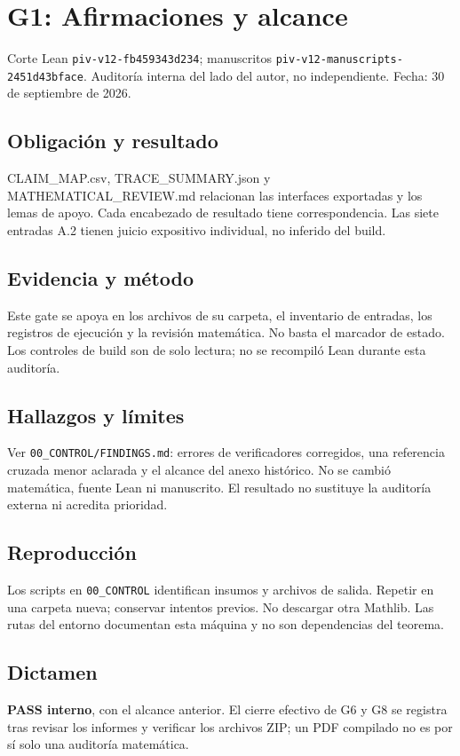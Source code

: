 \documentclass[11pt]{article}
\begin{document}
\section{G1: Afirmaciones y alcance}\label{g1-afirmaciones-y-alcance}

Corte Lean \nolinkurl{piv-v12-fb459343d234}; manuscritos
\nolinkurl{piv-v12-manuscripts-2451d43bface}. Auditoría interna del lado
del autor, no independiente. Fecha: 30 de septiembre de 2026.

\subsection{Obligación y resultado}\label{obligaciuxf3n-y-resultado}

CLAIM\_MAP.csv, TRACE\_SUMMARY.json y MATHEMATICAL\_REVIEW.md relacionan
las interfaces exportadas y los lemas de apoyo. Cada encabezado de
resultado tiene correspondencia. Las siete entradas A.2 tienen juicio
expositivo individual, no inferido del build.

\subsection{Evidencia y método}\label{evidencia-y-muxe9todo}

Este gate se apoya en los archivos de su carpeta, el inventario de
entradas, los registros de ejecución y la revisión matemática. No basta
el marcador de estado. Los controles de build son de solo lectura; no se
recompiló Lean durante esta auditoría.

\subsection{Hallazgos y límites}\label{hallazgos-y-luxedmites}

Ver \nolinkurl{00_CONTROL/FINDINGS.md}: errores de verificadores
corregidos, una referencia cruzada menor aclarada y el alcance del anexo
histórico. No se cambió matemática, fuente Lean ni manuscrito. El
resultado no sustituye la auditoría externa ni acredita prioridad.

\subsection{Reproducción}\label{reproducciuxf3n}

Los scripts en \nolinkurl{00_CONTROL} identifican insumos y archivos de
salida. Repetir en una carpeta nueva; conservar intentos previos. No
descargar otra Mathlib. Las rutas del entorno documentan esta máquina y
no son dependencias del teorema.

\subsection{Dictamen}\label{dictamen}

\textbf{PASS interno}, con el alcance anterior. El cierre efectivo de G6
y G8 se registra tras revisar los informes y verificar los archivos ZIP;
un PDF compilado no es por sí solo una auditoría matemática.
\end{document}
